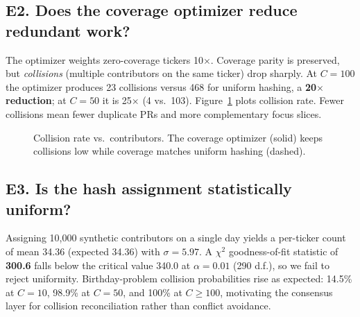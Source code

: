 \documentclass[10pt,twocolumn]{article}
\begin{document}
\subsection{E2. Does the coverage optimizer reduce redundant work?}

The optimizer weights zero-coverage tickers 10$\times$. Coverage parity is preserved, but \emph{collisions} (multiple contributors on the same ticker) drop sharply. At $C=100$ the optimizer produces 23 collisions versus 468 for uniform hashing, a \textbf{20$\times$ reduction}; at $C=50$ it is 25$\times$ (4 vs.\ 103). Figure~\ref{fig:collisions} plots collision rate. Fewer collisions mean fewer duplicate PRs and more complementary focus slices.

\begin{figure}[h]
\centering
{}
\caption{Collision rate vs.\ contributors. The coverage optimizer (solid) keeps collisions low while coverage matches uniform hashing (dashed).}
\label{fig:collisions}
\end{figure}

\subsection{E3. Is the hash assignment statistically uniform?}

Assigning 10{,}000 synthetic contributors on a single day yields a per-ticker count of mean 34.36 (expected 34.36) with $\sigma{=}5.97$. A $\chi^2$ goodness-of-fit statistic of \textbf{300.6} falls below the critical value 340.0 at $\alpha{=}0.01$ (290 d.f.), so we fail to reject uniformity. Birthday-problem collision probabilities rise as expected: 14.5\% at $C{=}10$, 98.9\% at $C{=}50$, and 100\% at $C{\geq}100$, motivating the consensus layer for collision reconciliation rather than conflict avoidance.
\end{document}
